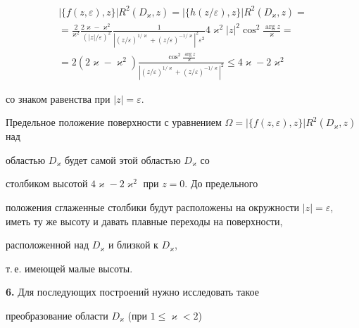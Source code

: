 \begin{multline*}


|\{f(z,\varepsilon),z\} |R^2(D_{\varkappa},z)=


|\{h(z/\varepsilon),z\} |R^2(D_{\varkappa},z)= \\


%


=\frac{2}{\varkappa^2} \frac{2\varkappa-\varkappa^2}


{(|z|/\varepsilon)^2}


\frac{1}{|(z/\varepsilon)^{1/\varkappa}+(z/\varepsilon)^{-1/\varkappa}


|^2\varepsilon^2}


4\varkappa^2|z|^2\cos^2\frac{\arg z}{\varkappa}=\\


%


=2(2\varkappa-\varkappa^2)\frac{\cos^2\frac{\arg z} 


{\varkappa}}{|({z/\varepsilon} )^{1/\varkappa}+(


{z/\varepsilon} )^{- 1/\varkappa} |^2}


\le 4\varkappa-2\varkappa^2


\end{multline*}


со знаком равенства при $|z|=\varepsilon $.





Предельное положение поверхности с уравнением $\Omega=|\{f(


{z,\varepsilon} ),z\} |R^2({D_{\varkappa},z})$ над 


областью $D_{\varkappa} $ будет самой этой областью $D_{\varkappa} $ со 


столбиком высотой $4\varkappa-2\varkappa^2$ при $z=0$. До предельного 


положения сглаженные столбики будут расположены на окружности $|z|=


\varepsilon$, иметь ту же высоту и давать плавные переходы на поверхности, 


расположенной над $D_{\varkappa}$ и близкой к $D_{\varkappa}$,


т.\,е. имеющей малые высоты.


\medskip





{\bf 6.} Для последующих построений нужно исследовать такое 


преобразование области $D_{\varkappa} $ (при $1 \le \varkappa < 2$)


